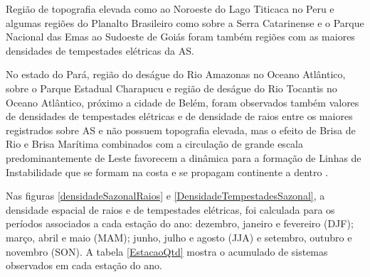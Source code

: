 Região de topografia elevada como ao Noroeste do Lago Titicaca no Peru e algumas regiões do Planalto Brasileiro como sobre a Serra Catarinense e o Parque Nacional das Emas ao Sudoeste de Goiás foram também regiões com as maiores densidades de tempestades elétricas da AS.

No estado do Pará, região do deságue do Rio Amazonas no Oceano Atlântico, sobre o Parque Estadual Charapucu e região de deságue do Rio Tocantis no Oceano Atlântico, próximo a cidade de Belém, foram observados também valores de densidades de tempestades elétricas e de densidade de raios entre os maiores registrados sobre AS e não possuem topografia elevada, mas o efeito de Brisa de Rio e Brisa Marítima combinados com a circulação de grande escala predominantemente de Leste favorecem a dinâmica para a formação de  Linhas de Instabilidade que se formam na costa e se propagam continente a dentro  \cite{kousky1980,cohen1995Li,Clenia2010}.


Nas figuras \ref{densidadeSazonalRaios} e \ref{DensidadeTempestadesSazonal}, a densidade espacial de raios e de tempestades elétricas, foi calculada para os períodos associados a cada estação do ano: dezembro, janeiro e fevereiro (DJF); março, abril e maio (MAM); junho, julho e agosto (JJA) e setembro, outubro e novembro (SON). A tabela \ref{EstacaoQtd} mostra o acumulado de sistemas observados em cada estação do ano.




\begin{sidewaysfigure}
  \caption{Densidade sazonal de raios. As cores representam o número de raios por ano por quilômetro quadrado ([ano$^{-1}$] [km$^{-2}$]) em cada ponto da grade de 0,25$^{\circ}$ $\times$ 0,25$^{\circ}$. } 
\label{densidadeSazonalRaios}
\end{sidewaysfigure}

